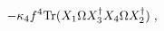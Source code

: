 \begin{equation}
\label{eq:omega2}
- \kappa_4 f^4 {\rm Tr}(X_1 \Omega X_3^\dagger X_4 \Omega
X_2^\dagger) \;, 
\end{equation} 
